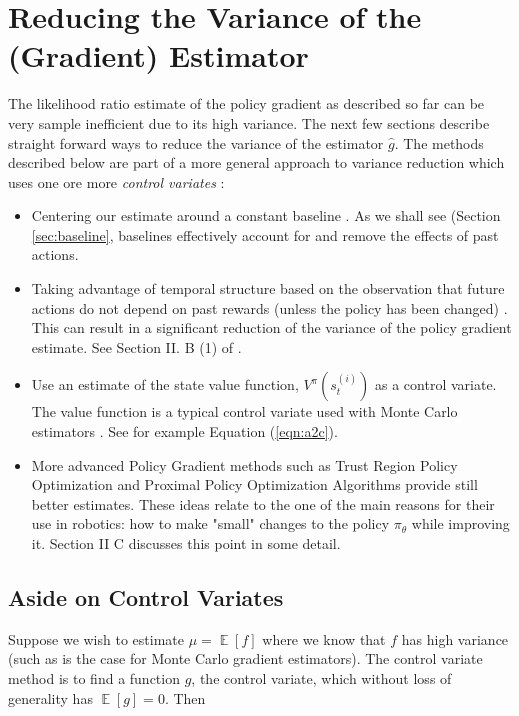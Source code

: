 \documentclass[11pt, oneside]{article}					%
\DeclareMathOperator{\E}{\mathbb{E}}
\begin{document}
\section{Reducing the Variance of the (Gradient) Estimator}
\label{sec:variance}
The likelihood ratio estimate of the policy gradient as described
so far can be very sample inefficient due to its high
variance. The next few sections describe straight forward ways to
reduce the variance of the estimator $\hat{g}$. The methods
described below are part of a more general approach to variance
reduction which uses one ore more \emph{control variates}
\cite{szechtman2003}:

\begin{itemize}
\item Centering our estimate around a constant baseline
\cite{Williams1992}. As we shall see (Section \ref{sec:baseline},
baselines effectively account for and remove the effects of past
actions. 
\item Taking advantage of temporal structure based on the
observation that future actions do not depend on past rewards
(unless the policy has been changed) . This can result in a
significant reduction of the variance of the policy gradient
estimate. See Section II. B (1) of \cite{Peters:2006fk}.
\item Use an estimate of the state value function,
$V^{\pi}(s^{(i)}_t)$ as a control variate. The value function is
a typical control variate used with Monte Carlo estimators
\cite{Greensmith:2004:VRT:1005332.1044710}.  See for example
Equation (\ref{eqn:a2c}).
\item More advanced Policy Gradient methods such as Trust Region
Policy Optimization \cite{DBLP:journals/corr/SchulmanLMJA15} and
Proximal Policy Optimization Algorithms
\cite{2017arXiv170706347S} provide still better estimates. These
ideas relate to the one of the main reasons for their use in
robotics: how to make "small" changes to the policy $\pi_\theta$
while improving it.  Section II C \cite{Peters:2006fk} discusses
this point in some detail.
\end{itemize}

\subsection{Aside on Control Variates}
\label{sec:control_variates}
Suppose we wish to estimate $\mu = \E[f]$ where we know that $f$
has high variance (such as is the case for Monte Carlo gradient
estimators).  The control variate method is to find a function
$g$, the control variate, which without loss of generality has
$\E[g] = 0$. Then
\end{document}
